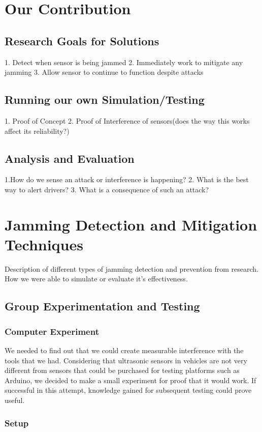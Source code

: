 \documentclass[conference]{IEEEtran}
\begin{document}
\section{Our Contribution}
\subsection{Research Goals for Solutions}
1. Detect when sensor is being jammed
2. Immediately work to mitigate any jamming
3. Allow sensor to continue to function despite attacks
\subsection{Running our own Simulation/Testing}
1. Proof of Concept
2. Proof of Interference of sensors(does the way this works affect its reliability?)
\subsection{Analysis and Evaluation}
1.How do we sense an attack or interference is happening?
2. What is the best way to alert drivers?
3. What is a consequence of such an attack?

\section{Jamming Detection and Mitigation Techniques}
Description of different types of jamming detection and prevention from research. How we were able to simulate or evaluate it's effectiveness.
\subsection{Group Experimentation and Testing}
\subsubsection{Computer Experiment}

We needed to find out that we could create measurable interference with the tools that we had. Considering that ultrasonic sensors in vehicles are not very different from sensors that could be purchased for testing platforms such as Arduino, we decided to make a small experiment for proof that it would work. If successful in this attempt, knowledge gained for subsequent testing could prove useful.

\subsubsection{Setup}
\end{document}

